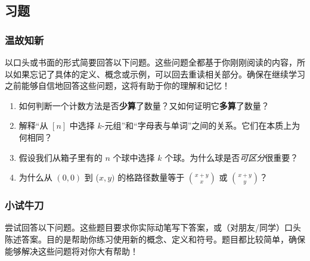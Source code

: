 
\subsection{习题}

\subsubsection*{温故知新}

以口头或书面的形式简要回答以下问题。这些问题全都基于你刚刚阅读的内容，所以如果忘记了具体的定义、概念或示例，可以回去重读相关部分。确保在继续学习之前能够自信地回答这些问题，这将有助于你的理解和记忆！

\begin{enumerate}[label=(\arabic*)]
    \item 如何判断一个计数方法是否\textbf{少算}了数量？又如何证明它\textbf{多算}了数量？
    \item 解释``从 $[n]$ 中选择 $k$-元组''和``字母表与单词''之间的关系。它们在本质上为何相同？
    \item 假设我们从箱子里有的 $n$ 个球中选择 $k$ 个球。为什么球是否\emph{可区分}很重要？
    \item 为什么从 $(0, 0)$ 到 ($x, y)$ 的格路径数量等于 ${x+y \choose x}$ 或 ${x+y \choose y}$？
\end{enumerate}

\subsubsection*{小试牛刀}

尝试回答以下问题。这些题目要求你实际动笔写下答案，或（对朋友/同学）口头陈述答案。目的是帮助你练习使用新的概念、定义和符号。题目都比较简单，确保能够解决这些问题将对你大有帮助！

